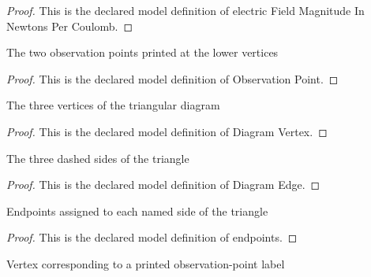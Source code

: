 \begin{proof}
  This is the declared model definition of electric Field Magnitude In Newtons Per Coulomb.
\end{proof}
\begin{definition}
  \label{def:physics:phyx-mini-0903:phyxminiproblems-problemphyxmini0903-observationpoint}
  The two observation points printed at the lower vertices
\end{definition}
\begin{proof}
  This is the declared model definition of Observation Point.
\end{proof}
\begin{definition}
  \label{def:physics:phyx-mini-0903:phyxminiproblems-problemphyxmini0903-diagramvertex}
  The three vertices of the triangular diagram
\end{definition}
\begin{proof}
  This is the declared model definition of Diagram Vertex.
\end{proof}
\begin{definition}
  \label{def:physics:phyx-mini-0903:phyxminiproblems-problemphyxmini0903-diagramedge}
  The three dashed sides of the triangle
\end{definition}
\begin{proof}
  This is the declared model definition of Diagram Edge.
\end{proof}
\begin{definition}[endpoints]
  \label{def:physics:phyx-mini-0903:phyxminiproblems-problemphyxmini0903-diagramedge-endpoints}
  Endpoints assigned to each named side of the triangle
\end{definition}
\begin{proof}
  This is the declared model definition of endpoints.
\end{proof}
\begin{definition}[vertex]
  \label{def:physics:phyx-mini-0903:phyxminiproblems-problemphyxmini0903-observationpoint-vertex}
  Vertex corresponding to a printed observation-point label
\end{definition}
